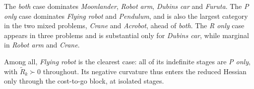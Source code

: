 \documentclass[class=scrbook, crop=false]{standalone}
\begin{document}
The \emph{both} case dominates \textsl{Moonlander}, \textsl{Robot arm}, \textsl{Dubins car} and \textsl{Furuta}.
The \emph{P only} case dominates \textsl{Flying robot} and \textsl{Pendulum},
and is also the largest category in the two mixed problems, \textsl{Crane} and \textsl{Acrobot}, ahead of \emph{both}.
The \emph{R only} case appears in three problems and is substantial only for \textsl{Dubins car},
while marginal in \textsl{Robot arm} and \textsl{Crane}.

Among all, \textsl{Flying robot} is the clearest case: all of its indefinite stages are \emph{P only}, 
with $\tilde{R}_k \succ 0$ throughout.
Its negative curvature thus enters the reduced Hessian only through the cost-to-go block, at isolated stages.
\end{document}
